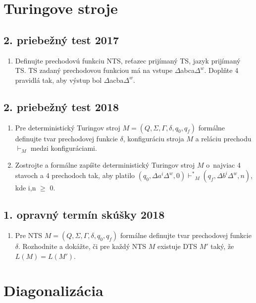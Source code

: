 \documentclass[11pt,a4paper]{article}
\begin{document}
	\section{Turingove stroje}

		\subsection{2. priebežný test 2017}

		\begin{enumerate}
			\item Definujte prechodovú funkciu NTS, reťazec prijímaný TS, jazyk prijímaný TS. TS zadaný prechodovou funkciou má na vstupe $\Delta$abca$\Delta^{w}$. Doplňte 4 pravidlá tak, aby výstup bol $\Delta$acba$\Delta^w$.
		\end{enumerate}

		\subsection{2. priebežný test 2018}

		\begin{enumerate}
			\item Pre deterministický Turingov stroj $M = (Q, \Sigma, \Gamma, \delta, q_0, q_f)$ formálne definujte tvar prechodovej funkcie $\delta$, konfiguráciu stroja $M$ a reláciu prechodu $\vdash_M$ medzi konfiguráciami.

			\item Zostrojte a formálne zapíšte deterministický Turingov stroj $M$ o~najviac 4 stavoch a 4 prechodoch tak, aby platilo $(q_0, \Delta a^i\Delta^w, 0) {\vdash^*}_M (q_f, \Delta b^i\Delta^w, n)$, kde i,n $\geq$ 0.
		\end{enumerate}
	
		\subsection{1. opravný termín skúšky 2018}
	
		\begin{enumerate}
			\item Pre NTS $M = (Q, \Sigma, \Gamma, \delta, q_0, q_f)$ formálne definujte tvar prechodovej funkcie $\delta$. Rozhodnite a dokážte, či pre každý NTS $M$ existuje DTS $M'$ taký, že $L(M) = L(M')$.
		\end{enumerate}

	\section{Diagonalizácia}
	
\end{document}
